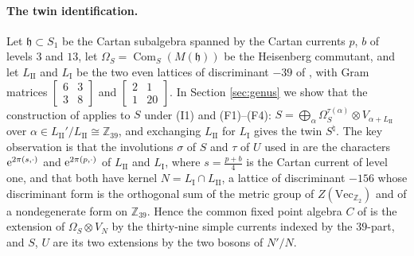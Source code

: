 \documentclass[leqno]{article}
\newcommand{\Z}{\ensuremath{\mathbb{Z}}}
\newcommand{\ot}{\otimes}
\let\i\relax
\newcommand{\i}{\mathrm{i}}
\newcommand{\e}{\mathrm{e}}
\numberwithin{equation}{section}
\begin{document}
\paragraph{The twin identification.}
Let $\mathfrak h \subset S_1$ be the Cartan subalgebra spanned by the Cartan currents $p$, $b$ of levels $3$ and $13$, let $\Omega_S = \operatorname{Com}_S(M(\mathfrak h))$ be the Heisenberg commutant, and let $L_{\mathrm{II}}$ and $L_{\mathrm I}$ be the two even lattices of discriminant $-39$ of \cite[Lemma 12.1]{Arh26}, with Gram matrices $\left[\begin{smallmatrix}6&3\\3&8\end{smallmatrix}\right]$ and $\left[\begin{smallmatrix}2&1\\1&20\end{smallmatrix}\right]$. In Section \ref{sec:genus} we show that the construction of \cite[Section 12]{Arh26} applies to $S$ under (I1) and (F1)--(F4): $S = \bigoplus_{\alpha} \Omega_S^{\tau(\alpha)} \ot V_{\alpha+L_{\mathrm{II}}}$ over $\alpha \in L_{\mathrm{II}}'/L_{\mathrm{II}} \cong \Z_{39}$, and exchanging $L_{\mathrm{II}}$ for $L_{\mathrm I}$ gives the twin $S^\natural$. The key observation is that the involutions $\sigma$ of $S$ and $\tau$ of $U$ used in \cite{DJX26} are the characters $\e^{2\pi\i(s,\cdot)}$ and $\e^{2\pi\i(p,\cdot)}$ of $L_{\mathrm{II}}$ and $L_{\mathrm I}$, where $s = \frac{p+b}4$ is the Cartan current of level one, and that both have kernel $N = L_{\mathrm I} \cap L_{\mathrm{II}}$, a lattice of discriminant $-156$ whose discriminant form is the orthogonal sum of the metric group of $Z(\mathrm{Vec}_{\Z_2})$ and of a nondegenerate form on $\Z_{39}$. Hence the common fixed point algebra $C$ of \cite[Theorem 7.3]{DJX26} is the extension of $\Omega_S \ot V_N$ by the thirty-nine simple currents indexed by the $39$-part, and $S$, $U$ are its two extensions by the two bosons of $N'/N$.
\end{document}
